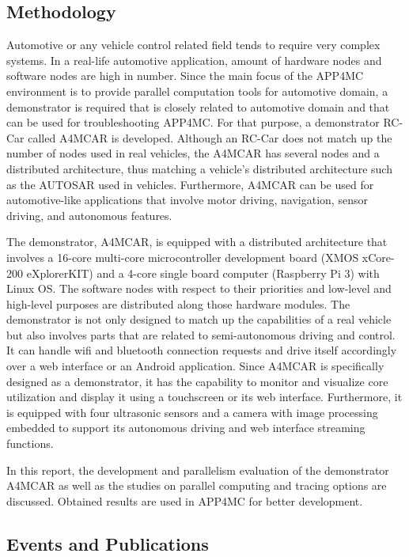 \subsection{Methodology}

Automotive or any vehicle control related field tends to require very complex systems. In a real-life automotive application, amount of hardware nodes and software nodes are high in number. Since the main focus of the APP4MC environment is to provide parallel computation tools for automotive domain, a demonstrator is required that is closely related to automotive domain and that can be used for troubleshooting APP4MC. For that purpose, a demonstrator RC-Car called A4MCAR is developed. Although an RC-Car does not match up the number of nodes used in real vehicles, the A4MCAR has several nodes and a distributed architecture, thus matching a vehicle's distributed architecture such as the AUTOSAR used in vehicles. Furthermore, A4MCAR can be used for automotive-like applications that involve motor driving, navigation, sensor driving, and autonomous features.

The demonstrator, A4MCAR, is equipped with a distributed architecture that involves a 16-core multi-core microcontroller development board (XMOS xCore-200 eXplorerKIT) and a 4-core single board computer (Raspberry Pi 3) with Linux OS. The software nodes with respect to their priorities and low-level and high-level purposes are distributed along those hardware modules. The demonstrator is not only designed to match up the capabilities of a real vehicle but also involves parts that are related to semi-autonomous driving and control. It can handle wifi and bluetooth connection requests and drive itself accordingly over a web interface or an Android application. Since A4MCAR is specifically designed as a demonstrator, it has the capability to monitor and visualize core utilization and display it using a touchscreen or its web interface. Furthermore, it is equipped with four ultrasonic sensors and a camera with image processing embedded to support its autonomous driving and web interface streaming functions.

In this report, the development and parallelism evaluation of the demonstrator A4MCAR as well as the studies on parallel computing and tracing options are discussed. Obtained results are used in APP4MC for better development. 

\subsection{Events and Publications}

